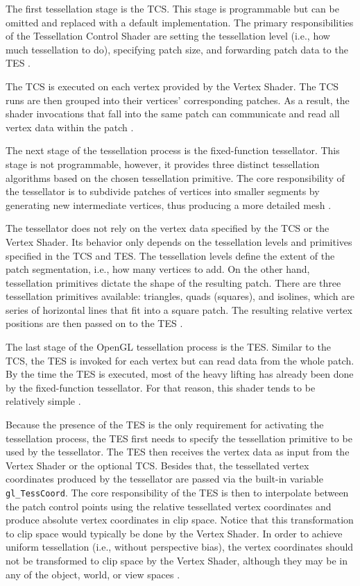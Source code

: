 \documentclass[
  digital,     %
  oneside,     %
  nosansbold,  %
  nocolorbold, %
  lof,         %
  lot,         %
]{fithesis4}
\begin{document}
The first tessellation stage is the TCS. This stage is programmable but can be
omitted and replaced with a default implementation. The primary responsibilities of the Tessellation
Control Shader are setting the tessellation level (i.e., how much tessellation to do), specifying patch
size, and forwarding patch data to the TES \cite{openglwiki-tcs}.

The TCS is executed on each vertex provided by the Vertex Shader. The TCS
runs are then grouped into their vertices' corresponding patches. As a result, the shader invocations
that fall into the same patch can communicate and read all vertex data within the patch \cite{openglwiki-tcs}.

The next stage of the tessellation process is the fixed-function tessellator. This stage is not
programmable, however, it provides three distinct tessellation algorithms based on the chosen
tessellation primitive. The core responsibility of the tessellator is to subdivide patches of vertices
into smaller segments by generating new intermediate vertices, thus producing a more detailed
mesh \cite{openglwiki-tessellation}.

The tessellator does not rely on the vertex data specified by the TCS or the
Vertex Shader. Its behavior only depends on the tessellation levels and primitives specified in the
TCS and TES. The tessellation levels define the extent of the patch segmentation, i.e.,
how many vertices to add. On the other hand, tessellation primitives dictate the shape of the
resulting patch. There are three tessellation primitives available: triangles, quads (squares), and
isolines, which are series of horizontal lines that fit into a square patch. The resulting relative vertex
positions are then passed on to the TES \cite{openglwiki-tessellation}.

The last stage of the OpenGL tessellation process is the TES. Similar to the
TCS, the TES is invoked for each vertex but can read data from the whole
patch. By the time the TES is executed, most of the heavy lifting has already been done by the fixed-function tessellator. For that reason, this shader tends to be relatively simple \cite{openglwiki-tessellation}.

Because the presence of the TES is the only requirement for activating the tessellation process, the
TES first needs to specify the tessellation primitive to be used by the tessellator. The TES then
receives the vertex data as input from the Vertex Shader or the optional TCS.
Besides that, the tessellated vertex coordinates produced by the tessellator are passed via the built-in variable \verb|gl_TessCoord|. The core responsibility of the TES is then to interpolate between
the patch control points using the relative tessellated vertex coordinates and produce absolute vertex
coordinates in clip space. Notice that this transformation to clip space would typically be done by
the Vertex Shader. In order to achieve uniform tessellation (i.e., without perspective bias),
the vertex coordinates should not be transformed to clip space by the Vertex Shader,
although they may be in any of the object, world, or view spaces
\cite{learnopengl-tessellation}\cite{openglwiki-tessellation}.
\end{document}
